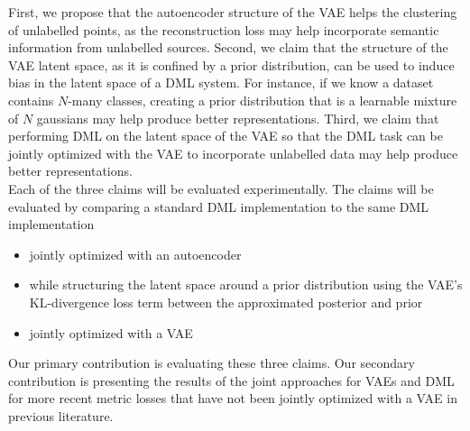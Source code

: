 \documentclass[./dissertation.tex]{subfiles}
\begin{document}
    First, we propose that the autoencoder structure of the VAE helps the clustering of unlabelled points, as the reconstruction loss may help incorporate semantic information from unlabelled sources. Second, we claim that the structure of the VAE latent space, as it is confined by a prior distribution, can be used to induce bias in the latent space of a DML system. For instance, if we know a dataset contains $N$-many classes, creating a prior distribution that is a learnable mixture of $N$ gaussians may help produce better representations. Third, we claim that performing DML on the latent space of the VAE so that the DML task can be jointly optimized with the VAE to incorporate unlabelled data may help produce better representations. \\
    
    Each of the three claims will be evaluated experimentally. The claims will be evaluated by comparing a standard DML implementation to the same DML implementation
    \begin{itemize}
        \item jointly optimized with an autoencoder
        \item while structuring the latent space around a prior distribution using the VAE’s KL-divergence loss term between the approximated posterior and prior
        \item jointly optimized with a VAE
    \end{itemize}
    
    Our primary contribution is evaluating these three claims. Our secondary contribution is presenting the results of the joint approaches for VAEs and DML for more recent metric losses that have not been jointly optimized with a VAE in previous literature. 
\end{document}
